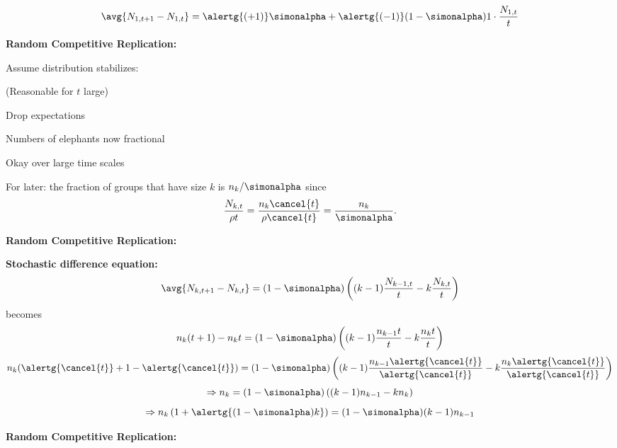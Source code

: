   
   {
    $$
    \avg{N_{1,t+1} - N_{1,t}}
    =
    \alertg{(+1)}
    \simonalpha
    +
    \alertg{(-1)}
    (1-\simonalpha)
    1\cdot\frac{N_{1,t}}{t}
    $$
  }
  


  \textbf{Random Competitive Replication:}

  
  {
    Assume distribution stabilizes: 
  }

  \smallskip
  
  {
    (Reasonable for $t$ large)
  }
  

  \bigskip

  
    
     
      Drop expectations
     
      Numbers of elephants now fractional
     
      Okay over large time scales 
    
  

  
    
     
      For later:  the fraction of groups that have
      size $k$ is $n_k/\simonalpha$ since
      $$
      \frac{N_{k,t}}{\rho t} 
      = 
      \frac{n_{k} \cancel{t}}{\rho \cancel{t}}
      =
      \frac{n_{k}}{\simonalpha}.
      $$
    
  


  \textbf{Random Competitive Replication:}

  \textbf{Stochastic difference equation:}
    {
      $$
      \avg{N_{k,t+1} - N_{k,t}}
      =
      (1-\simonalpha)
      \left(
        (k-1)\frac{N_{k-1,t}}{t}
        -
        k\frac{N_{k,t}}{t}
      \right)
      $$
    }
    becomes
    {
      $$
      n_k(t+1)-n_k t
      =
      (1-\simonalpha)
      \left(
        (k-1)\frac{n_{k-1}t}{t}
        -
        k\frac{n_{k}t}{t}
      \right)
      $$}
    {
      $$
      n_k(\alertg{\cancel{t}}+1-\alertg{\cancel{t}})
      =
      (1-\simonalpha)
      \left(
        (k-1)\frac{n_{k-1}\alertg{\cancel{t}}}{\alertg{\cancel{t}}}
        -
        k\frac{n_{k}\alertg{\cancel{t}}}{\alertg{\cancel{t}}}
      \right)
      $$}
    {
      $$
      \Rightarrow
      n_k
      =
      (1-\simonalpha)
      \left(
        (k-1)n_{k-1}
        -
        kn_{k}
      \right)
      $$
    }
    {
      $$
      \Rightarrow
      n_k\left( 1 + \alertg{(1-\simonalpha)k} \right)
      =
      (1-\simonalpha)
      (k-1)
      n_{k-1}
      $$
    }
  



  \textbf{Random Competitive Replication:}

